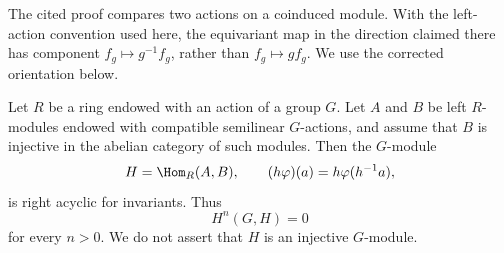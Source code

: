 \begin{lemma}
\label{lemma-skew-group-hom-injective-acyclic}
\begin{reference}
\cite[Chapter V, \S 5.6, Corollary and proof, pp. 215--216]{Tohoku}
\end{reference}
\begin{history}
The cited proof compares two actions on a coinduced module. With the
left-action convention used here, the equivariant map in the direction
claimed there has component $f_g\mapsto g^{-1}f_g$, rather than
$f_g\mapsto gf_g$. We use the corrected orientation below.
\end{history}
Let $R$ be a ring endowed with an action of a group $G$. Let $A$ and $B$
be left $R$-modules endowed with compatible semilinear $G$-actions, and
assume that $B$ is injective in the abelian category of such modules. Then
the $G$-module
$$
H=\Hom_R(A,B),
\qquad
(h\varphi)(a)=h\varphi(h^{-1}a),
$$
is right acyclic for invariants. Thus
$$
H^n(G,H)=0
$$
for every $n>0$. We do not assert that $H$ is an injective $G$-module.
\end{lemma}

